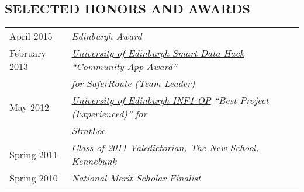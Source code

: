 \documentclass[line, margin]{res}
\begin{document}
\begin{resume}
\section{SELECTED HONORS AND AWARDS}
\begin{tabular}{@{}l l}
April 2015 & \textit{Edinburgh Award} \linebreak \\[5pt]
February 2013 & \textit{\href{http://data.inf.ed.ac.uk/ilwhack/finalprojects.php}{University of Edinburgh Smart Data Hack} ``Community App Award''}\linebreak\\[1pt] 
&\textit{for \href{https://github.com/team-tusive/ilwhack}{SaferRoute} (Team Leader)} \linebreak \\[5pt]
May 2012 & \textit{\href{https://sites.google.com/site/2012oop/winners}{University of Edinburgh INF1-OP} ``Best Project (Experienced)'' for} \linebreak \\[1pt] 
 &\textit{\href{http://www.chasestevens.com/team2civ/}{StratLoc}} \linebreak \\[5pt]
Spring 2011 & \textit{Class of 2011 Valedictorian, The New School, Kennebunk} \\[5pt]
Spring 2010 & \textit{National Merit Scholar Finalist} \\[5pt]
\end{tabular}
\end{resume}
\end{document}
